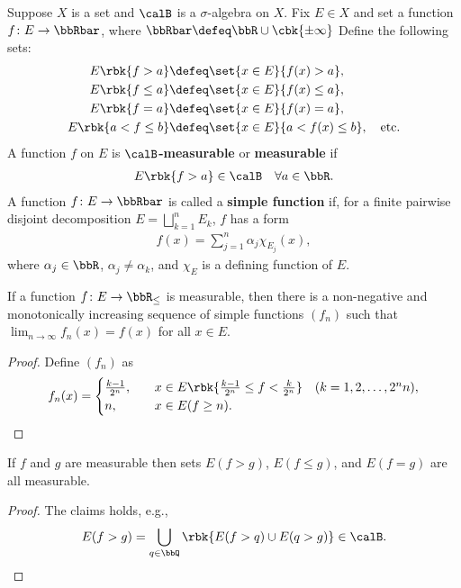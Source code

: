 \documentclass[openany, a4paper, oneside]{jsbook}
\begin{document}
Suppose $X$ is a set and $\calB$ is a $\sigma$-algebra on $X$.
Fix $E \in X$ and set a function $f \colon E \to \bbRbar$, where $\bbRbar \defeq \bbR \cup \cbk{\pm \infty}$
Define the following sets:
\begin{align}
 E \rbk{f > a}
 &\defeq
 \set{x \in E}{f (x) > a}, \\
 E \rbk{f \leq a}
 &\defeq
 \set{x \in E}{f (x) \leq a}, \\
 E \rbk{f = a}
 &\defeq
 \set{x \in E}{f (x) = a}, \\
 E \rbk{a < f \leq b}
 &\defeq
 \set{x \in E}{a < f (x) \leq b}, \quad \text{etc.}\\
\end{align}
A function $f$ on $E$ is \textbf{$\calB$-measurable} or \textbf{measurable} if
\begin{align}
 E \rbk{f > a} \in \calB \quad \forall a \in \bbR.
\end{align}
A function $f \colon E \to \bbRbar$ is called a \textbf{simple function} if,
for a finite pairwise disjoint decomposition $E = \bigsqcup_{k=1}^n E_k$, $f$ has a form
\begin{align}
 f (x)
 =
 \sum_{j=1}^n \alpha_j \chi_{E_j}(x),
\end{align}
where $\alpha_j \in \bbR$, $\alpha_j \neq \alpha_k$, and $\chi_{E}$ is a defining function of $E$.
\begin{thm}
 If a function $f \colon E \to \bbR_{\leq}$ is measurable,
 then there is a non-negative and  monotonically increasing sequence of simple functions $(f_n)$
 such that $\lim_{n \to \infty} f_n (x) = f (x)$ for all $x \in E$.
\end{thm}
\begin{proof}
Define $(f_n)$ as
\begin{align}
 f_n (x)
 =
 \begin{cases}
  \frac{k-1}{2^n}, \quad &x \in E\rbk{\frac{k-1}{2^n} \leq f < \frac{k}{2^n}} \quad (k = 1, 2, \dots, 2^n n), \\
  n, \quad &x \in E (f \geq n).
 \end{cases}
\end{align}
\end{proof}
\begin{thm}
 If $f$ and $g$ are measurable then sets $E (f > g)$, $E (f \leq g)$, and $E (f = g)$ are all measurable.
\end{thm}
\begin{proof}
The claims holds, e.g.,
\begin{align}
 E (f > g)
 =
 \bigcup_{q \in \bbQ} \rbk{E (f > q) \cup E (q > g)}
 \in
 \calB.
\end{align}
\end{proof}
\end{document}
